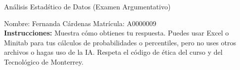 \documentclass[8pt]{report}
\begin{document}
\newpage



\begin{center}
{An\'alisis Estad\'stico de Datos (Examen Argumentativo)}
\end{center}

Nombre: \underline{\hspace*{.2in}}
Fernanda Cárdenas
\underline{\hspace*{.2in}} \quad Matr\'icula:\underline{\hspace*{.2in}}
A0000009
\underline{\hspace*{.2in}} \\

{\bf Instrucciones:} Muestra c\'omo obtienes tu respuesta. Puedes usar Excel 
o Minitab para tus cálculos de probabilidades o 
percentiles, pero no uses otros archivos o hagas uso de la IA. Respeta el 
c\'odigo de \'etica del curso y del Tecnol\'ogico 
de Monterrey.
\end{document}
